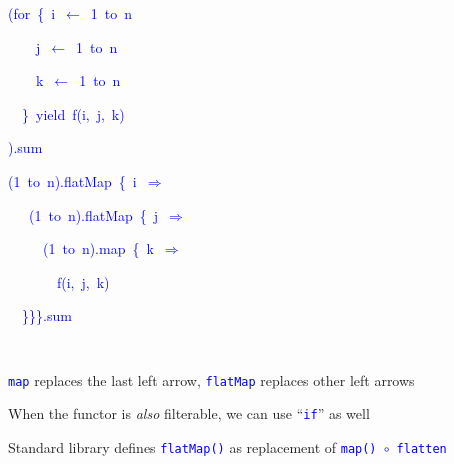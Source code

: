 \texttt{\textcolor{blue}{\footnotesize{}}}%
\begin{minipage}[t]{0.49\columnwidth}%
\begin{lyxcode}
\textcolor{blue}{\footnotesize{}(for~\{~i~$\leftarrow$~1~to~n}{\footnotesize\par}

\textcolor{blue}{\footnotesize{}~~~~j~$\leftarrow$~1~to~n}{\footnotesize\par}

\textcolor{blue}{\footnotesize{}~~~~k~$\leftarrow$~1~to~n}{\footnotesize\par}

\textcolor{blue}{\footnotesize{}~~\}~yield~f(i,~j,~k)}{\footnotesize\par}

\textcolor{blue}{\footnotesize{}).sum}{\footnotesize\par}
\end{lyxcode}
%
\end{minipage}\texttt{\textcolor{blue}{\footnotesize{}}}%
\begin{minipage}[t]{0.49\columnwidth}%
\begin{lyxcode}
\textcolor{blue}{\footnotesize{}(1~to~n).flatMap~\{~i~$\Rightarrow$}{\footnotesize\par}

\textcolor{blue}{\footnotesize{}~~~(1~to~n).flatMap~\{~j~$\Rightarrow$}{\footnotesize\par}

\textcolor{blue}{\footnotesize{}~~~~~(1~to~n).map~\{~k~$\Rightarrow$}{\footnotesize\par}

\textcolor{blue}{\footnotesize{}~~~~~~~f(i,~j,~k)}{\footnotesize\par}

\textcolor{blue}{\footnotesize{}~~\}\}\}.sum}{\footnotesize\par}
\end{lyxcode}
%
\end{minipage}\texttt{\textcolor{blue}{\footnotesize{}\medskip{}
}}{\footnotesize\par}

\texttt{\textcolor{blue}{\footnotesize{}map}} replaces the last left
arrow, \texttt{\textcolor{blue}{\footnotesize{}flatMap}} replaces
other left arrows

When the functor is \emph{also} filterable, we can use ``\texttt{\textcolor{blue}{\footnotesize{}if}}''
as well

Standard library defines \texttt{\textcolor{blue}{\footnotesize{}flatMap()}}
as replacement of \texttt{\textcolor{blue}{\footnotesize{}map() $\circ$
flatten}} 

